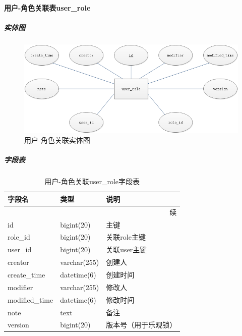 \documentclass[titlepage,UTF8,linespread=1.5]{ctexart}
\begin{document}
\paragraph{用户-角色关联表user\_role}
\subparagraph{实体图}
\begin{figure}[H]
    \centering
    \includegraphics[width=140mm]{entity-user-role.png}
    \caption{用户-角色关联实体图}
    \label{fig:entity-user-role}
\end{figure}
\subparagraph{字段表}
\begin{longtable}{|p{10em}|p{6em}|p{15em}|}
    \caption{用户-角色关联user\_role字段表}\label{tab:table_user_role} \\\hline
    字段名         & 类型         & 说明                               \\\hline
    \endfirsthead
    \multicolumn{3}{r}{{续\tablename\thetable{}}}                      \\\hline
    \endhead
    id             & bigint(20)   & 主键                               \\\hline
    role\_id       & bigint(20)   & 关联role主键                       \\\hline
    user\_id       & bigint(20)   & 关联user主键                       \\\hline
    creator        & varchar(255) & 创建人                             \\\hline
    create\_time   & datetime(6)  & 创建时间                           \\\hline
    modifier       & varchar(255) & 修改人                             \\\hline
    modified\_time & datetime(6)  & 修改时间                           \\\hline
    note           & text         & 备注                               \\\hline
    version        & bigint(20)   & 版本号（用于乐观锁）               \\\hline
\end{longtable}\par
\end{document}
